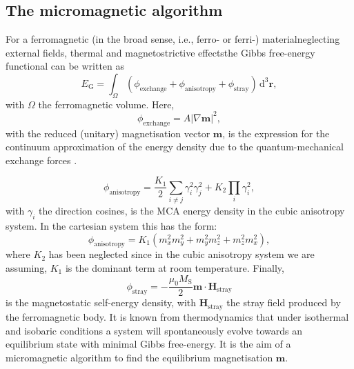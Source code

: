 \subsection{The micromagnetic algorithm}
For a ferromagnetic (in the broad sense, i.e., ferro- or ferri-) material{\textemdash}neglecting external fields, thermal and magnetostrictive effects{\textemdash}the Gibbs free-energy functional can be written as \citep{Brown}
\begin{equation}
E_\text{G} = \int_{\Omega} (\phi_{\text{exchange}} + \phi_{\text{anisotropy}} + \phi_{\text{stray}})\,\text{d}^3 \boldsymbol{r},
\end{equation}
with $\Omega$ the ferromagnetic volume. Here,
\begin{equation}
\phi_{\text{exchange}}=A|\nabla\boldsymbol{m}|^2,
\end{equation}
 with the reduced (unitary) magnetisation vector $\boldsymbol{m}$, is the expression for the continuum approximation of the energy density due to the quantum-mechanical exchange forces \citep{Landau1935}.\par

\begin{equation}
\phi_{\text{anisotropy}}=\frac{K_1}{2}\sum_{i\neq j}\gamma_i^2\gamma_j^2 + K_2\prod_i\gamma_i^2,
\end{equation}
with $\gamma_i$ the direction cosines, is the MCA energy density in the cubic anisotropy system. In the cartesian system this has the form:
\begin{equation}
\phi_{\text{anisotropy}}=K_1(m_x^2m_y^2+m_y^2m_z^2+m_z^2m_x^2),
\end{equation}
where $K_2$ has been neglected since in the cubic anisotropy system we are assuming, $K_1$ is the dominant term at room temperature. Finally,
\begin{equation}
\phi_{\text{stray}}=-\frac{\mu_0M_\text{S}}{2}\boldsymbol{m}\cdot\boldsymbol{H}_{\text{stray}}
\end{equation}
is the magnetostatic self-energy density, with $\boldsymbol{H}_{\text{stray}}$ the stray field produced by the ferromagnetic body. It is known from thermodynamics that under isothermal and isobaric conditions a system will spontaneously evolve towards an equilibrium state with minimal Gibbs free-energy. It is the aim of a micromagnetic algorithm to find the equilibrium magnetisation $\boldsymbol{m}$.\par

